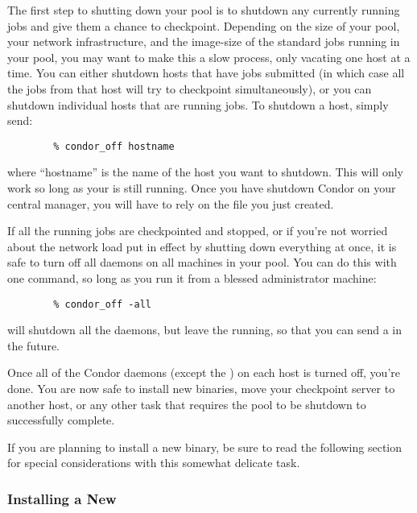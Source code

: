 The first step to shutting down your pool is to shutdown any currently
running jobs and give them a chance to checkpoint.
Depending on the size of your pool, your network infrastructure, and
the image-size of the standard jobs running in your pool, you may want
to make this a slow process, only vacating one host at a time.
You can either shutdown hosts that have jobs submitted (in which case
all the jobs from that host will try to checkpoint simultaneously), or
you can shutdown individual hosts that are running jobs.
To shutdown a host, simply send:
\begin{verbatim}
        % condor_off hostname
\end{verbatim}
where ``hostname'' is the name of the host you want to shutdown.
This will only work so long as your  is still
running.
Once you have shutdown Condor on your central manager, you will have
to rely on the  file you just created.

If all the running jobs are checkpointed and stopped, or if you're not
worried about the network load put in effect by shutting down
everything at once, it is safe to turn off all daemons on all machines
in your pool.
You can do this with one command, so long as you run it from a blessed
administrator machine:
\begin{verbatim}
        % condor_off -all
\end{verbatim}

 will shutdown all the daemons, but leave the
 running, so that you can send a  in the
future.  

Once all of the Condor daemons (except the ) on each
host is turned off, you're done.
You are now safe to install new binaries, move your checkpoint server
to another host, or any other task that requires the pool to be
shutdown to successfully complete.

\Note If you are planning to install a new  binary, be
sure to read the following section for special considerations with
this somewhat delicate task.

\subsubsection{\label{sec:New-Master}Installing a New }

